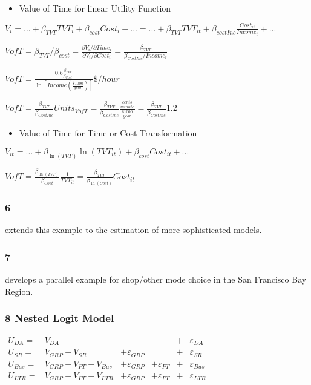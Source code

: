 \documentclass[
]{article}
\providecommand{\tightlist}{%
  \setlength{\itemsep}{0pt}\setlength{\parskip}{0pt}}
\begin{document}
\begin{itemize}
\tightlist
\item
  Value of Time for linear Utility Function
\end{itemize}

\(V_i=...+\beta_{TVT}TVT_i+\beta_{cost}Cost_i+...=...+\beta_{TVT}TVT_{it}+\beta_{costInc}\frac{Cost_{it}}{Income_t}+...\)

\(VofT=\beta_{TVT}/\beta_{cost}=\frac{\partial V_i/\partial Time_i}{\partial V_i/\partial Cost_i}=\frac{\beta_{TVT}}{\beta_{CostInc}/Income_t}\)

\(VofT=\frac{0.6\frac{\beta_{TVT}}{\beta_{Cost}}}{\ln[Income(\frac{\$1000}{year})]}\$/hour\)

\(VofT=\frac{\beta_{TVT}}{\beta_{CostInc}}Units_{VofT}=\frac{\beta_{TVT}}{\beta_{CostInc}}\frac{\frac{cents}{minute}}{\frac{\$1000}{year}}=\frac{\beta_{TVT}}{\beta_{CostInc}}1.2\)

\begin{itemize}
\tightlist
\item
  Value of Time for Time or Cost Transformation
\end{itemize}

\(V_{it}=...+\beta_{\ln(TVT)}\ln(TVT_{it})+\beta_{cost}Cost_{it}+...\)

\(VofT=\frac{\beta_{\ln(TVT)}}{\beta_{Cost}}\frac1{TVT_{it}}=\frac{\beta_{TVT}}{\beta_{\ln(Cost)}}Cost_{it}\)

\hypertarget{section-1}{%
\subsubsection{6}\label{section-1}}

extends this example to the estimation of more sophisticated models.

\hypertarget{section-2}{%
\subsubsection{7}\label{section-2}}

develops a parallel example for shop/other mode choice in the San
Francisco Bay Region.

\hypertarget{nested-logit-model}{%
\subsubsection{8 Nested Logit Model}\label{nested-logit-model}}

\(\begin{align*} U_{DA}=&V_{DA} &&&+&\varepsilon_{DA}\\ U_{SR}=&V_{GRP}+V_{SR} &+\varepsilon_{GRP}&&+&\varepsilon_{SR}\\ U_{Bus}=&V_{GRP}+V_{PT}+V_{Bus}&+\varepsilon_{GRP}&+\varepsilon_{PT}&+&\varepsilon_{Bus}\\ U_{LTR}=&V_{GRP}+V_{PT}+V_{LTR}&+\varepsilon_{GRP}&+\varepsilon_{PT}&+&\varepsilon_{LTR} \end{align*}\)
\end{document}
